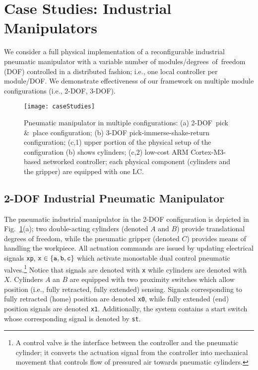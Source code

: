 

\section{Case Studies: Industrial Manipulators}
\label{sec:evaluation}
We consider a full physical implementation of a reconfigurable industrial pneumatic manipulator with a variable number of modules/degrees~of~freedom (DOF) controlled in a distributed fashion; i.e., one local controller per module/DOF. We demonstrate effectiveness of our framework on multiple module configurations (i.e., 2-DOF, 3-DOF).

%
\begin{figure}[t]
	\centering
	\texttt{[image: caseStudies]}
	\caption{Pneumatic manipulator in multiple configurations: (a) 2-DOF~pick \&~place configuration; (b) 3-DOF pick-immerse-shake-return configuration; (c,1) upper portion of the physical setup of the configuration (b) shows cylinders; (c,2) low-cost ARM Cortex-M3-based networked controller; each physical component (cylinders and the gripper) are equipped with one LC.}%
	\label{fig:caseStudies}
\end{figure}
%

\subsection{2-DOF Industrial Pneumatic Manipulator}
The pneumatic industrial manipulator in the 2-DOF configuration is depicted in Fig.~\ref{fig:caseStudies}(a); two double-acting cylinders (denoted $A$ and $B$) provide translational degrees of freedom, while the pneumatic gripper (denoted $C$) provides means of handling the workpiece. All actuation commands are issued by updating electrical signals \verb!xp!, $\verb!x!\in\{\verb!a!,\verb!b!,\verb!c!\}$ which activate monostable dual control pneumatic valves.\footnote{ A control valve is the interface between the controller and the pneumatic cylinder; it converts the actuation signal from the controller into mechanical movement that controls flow of pressured air towards pneumatic cylinders.} Notice that signals are denoted with \verb!x! while cylinders are denoted with $X$. Cylinders $A$ an $B$ are equipped with two proximity switches which allow position (i.e., fully retracted, fully extended) sensing. Signals corresponding to fully retracted (home) position are denoted \verb!x0!, while fully extended (end) position signals are denoted \verb!x1!. Additionally, the system contains a start switch whose corresponding signal is denoted by \verb!st!.


